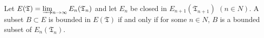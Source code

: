 Let $E(\mathfrak{T}) = \varinjlim_{n \to \infty} E_n(\mathfrak{T}_n)$ and let $E_n$ be closed in $E_{n+1}(\mathfrak{T}_{n+1})$ $(n \in N)$. A subset $B \subset E$ is bounded in $E(\mathfrak{T})$ if and only if for some $n \in N$, $B$ is a bounded subset of $E_n(\mathfrak{T}_n)$.
